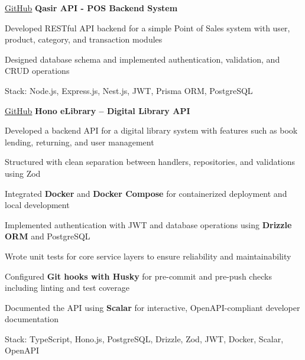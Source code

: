 \vspace{0.3 cm}


\begin{twocolentrylink}{
		\href{https://github.com/masmuss/qasir-api.git}{GitHub}
	}
	\textbf{Qasir API - POS Backend System}
\end{twocolentrylink}
\begin{onecolentry}
	\begin{highlights}
		\item Developed RESTful API backend for a simple Point of Sales system with user, product, category, and transaction modules
		\item Designed database schema and implemented authentication, validation, and CRUD operations
		\item Stack: Node.js, Express.js, Nest.js, JWT, Prisma ORM, PostgreSQL
	\end{highlights}
\end{onecolentry}

\vspace{0.3 cm}


\begin{twocolentrylink}{
		\href{https://github.com/masmuss/hono-elibrary.git}{GitHub}
	}
	\textbf{Hono eLibrary -- Digital Library API}
\end{twocolentrylink}
\begin{onecolentry}
	\begin{highlights}
		\item Developed a backend API for a digital library system with features such as book lending, returning, and user management
		\item Structured with clean separation between handlers, repositories, and validations using Zod
		\item Integrated \textbf{Docker} and \textbf{Docker Compose} for containerized deployment and local development
		\item Implemented authentication with JWT and database operations using \textbf{Drizzle ORM} and PostgreSQL
		\item Wrote unit tests for core service layers to ensure reliability and maintainability
		\item Configured \textbf{Git hooks with Husky} for pre-commit and pre-push checks including linting and test coverage
		\item Documented the API using \textbf{Scalar} for interactive, OpenAPI-compliant developer documentation
		\item Stack: TypeScript, Hono.js, PostgreSQL, Drizzle, Zod, JWT, Docker, Scalar, OpenAPI
	\end{highlights}
\end{onecolentry}


